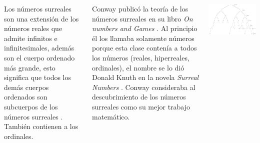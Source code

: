 \documentclass[20pt,margin=2.2cm,innermargin=-4.5in,blockverticalspace=-0.25in]{tikzposter}
\begin{document}
\begin{columns}
{        Los n\'umeros surreales son una extensi\'on de los n\'umeros reales que admite infinitos e infinitesimales, adem\'as son el cuerpo ordenado m\'as grande, esto significa que todos los dem\'as cuerpos ordenados son subcuerpos de los n\'umeros surreales \cite{Bajnok2013}. Tambi\'en contienen a los ordinales.

        Conway public\'o la teor\'ia de los n\'umeros surreales en su libro \textit{On numbers and Games} \cite{Conway2000}. Al principio \'el los llamaba solamente n\'umeros porque esta clase conten\'ia a todos los n\'umeros (reales, hiperreales, ordinales), el nombre se lo di\'o Donald Knuth en la novela \textit{Surreal Numbers} \cite{Knuth1974-wh}. Conway consideraba al descubrimiento de los n\'umeros surreales como su mejor trabajo matem\'atico.
        \vspace{5mm}

        \begin{minipage}[t]{\linewidth}
            \centering
            \includegraphics[width=\textwidth]{images/surreal-infinite.pdf}
        \end{minipage}
    }
    

\end{columns}
\end{document}
